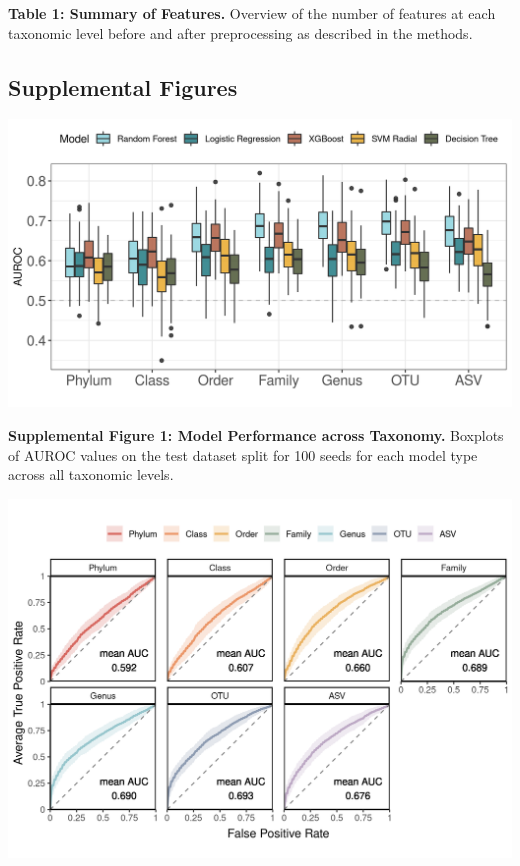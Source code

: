 \documentclass[
]{article}
\begin{document}
\textbf{Table 1: Summary of Features.} Overview of the number of
features at each taxonomic level before and after preprocessing as
described in the methods.

\newpage

\hypertarget{supplemental-figures}{%
\subsection{Supplemental Figures}\label{supplemental-figures}}

\includegraphics{figure_s1.png}

\textbf{Supplemental Figure 1: Model Performance across Taxonomy.}
Boxplots of AUROC values on the test dataset split for 100 seeds for
each model type across all taxonomic levels.

\newpage

\includegraphics[width=\textwidth,height=0.5\textheight]{figure_s2.png}
\end{document}

